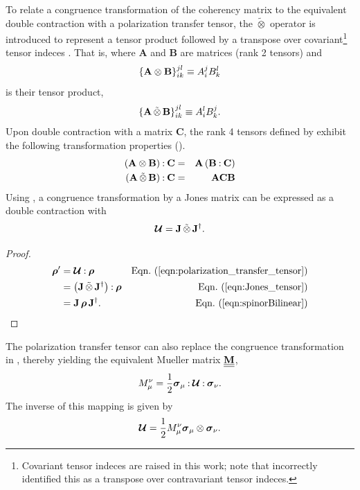 To relate a congruence transformation of the coherency matrix to the equivalent double contraction with
a polarization transfer tensor, the $\tilde\otimes$ operator is introduced to represent 
a tensor product followed by a transpose over covariant\footnote{ 
Covariant tensor indeces are raised in this work; note that \cite{vt17} incorrectly identified this as a transpose over contravariant tensor indeces.} 
tensor indeces \citep{car91}.
%
That is, where {\bf A} and {\bf B} are matrices (rank 2 tensors) and
%
\begin{equation}
\left\{{\bf A}\otimes{\bf B}\right\}_{ik}^{jl}
 \equiv 
A_i^j B_k^l  \label{eqn:indexOuterBilinear}
\end{equation}
is their tensor product,
\begin{equation}
\left\{{\bf A}\,\tilde{\otimes}\,{\bf B}\right\}_{ik}^{jl}
 \equiv 
A_i^l B_k^j. \label{eqn:indexSpinorBilinear}
\end{equation}
%
Upon double contraction with a matrix {\bf C}, the rank 4 tensors defined by  exhibit the following transformation properties ().
%
\begin{eqnarray}
\left( \outerBilinear{\bf A}{\bf B} \right) \dcbo {\bf C}
& = &
{\bf A}\left(\dc{\bf B}{\bf C}\right) \label{eqn:outerBilinear} \\
%
\left( \spinorBilinear{\bf A}{\bf B} \right) \dcbo {\bf C}
& = &
{\bf A}{\bf C}{\bf B} \label{eqn:spinorBilinear}
\end{eqnarray}
%
Using , a congruence transformation by a Jones matrix  can be expressed as a double contraction with
\begin{equation}
\label{eqn:Jones_tensor}
    \mbox{\boldmath $\mathcal{U}$}= {\bf J}\,\tilde{\otimes}\,{\bf J}^\dagger.
\end{equation}

\begin{proof}
\begin{align*}
\cohM{\rho}' &= \JT{U} \dcbo \cohM{\rho} & \peqn{polarization_transfer_tensor} \\
&= \left( \spinorBilinear{\bf J}{\bf J}^\dagger \right)\dcbo \cohM{\rho} & \peqn{Jones_tensor} \\
&= \JM{J} \, \cohM{\rho} \, \JM{J}^\dagger. & \peqn{spinorBilinear}
\end{align*}
\end{proof}

The polarization transfer tensor can also replace the congruence transformation in , thereby yielding the
equivalent Mueller matrix $\underline{\underline{{\bf M}}}$,
%
\begin{equation}
M_\mu^\nu
= \frac{1}{2} {\mbox{\boldmath $\sigma$}_{\mu}}\mathbin{:}{{\mbox{\boldmath $\mathcal{U}$}}\mathbin{:}{\mbox{\boldmath $\sigma$}_{\nu}}}.
\label{eqn:tensor_to_Mueller}
\end{equation}
%
The inverse of this mapping is given by
%
\begin{equation}
\mbox{\boldmath $\mathcal{U}$} = \frac{1}{2} M_\mu^\nu {\ensuremath{\mbox{\boldmath $\sigma$}_{\mu}}}\otimes{\ensuremath{\mbox{\boldmath $\sigma$}_{\nu}}}.
\label{eqn:Mueller_to_tensor}
\end{equation}

